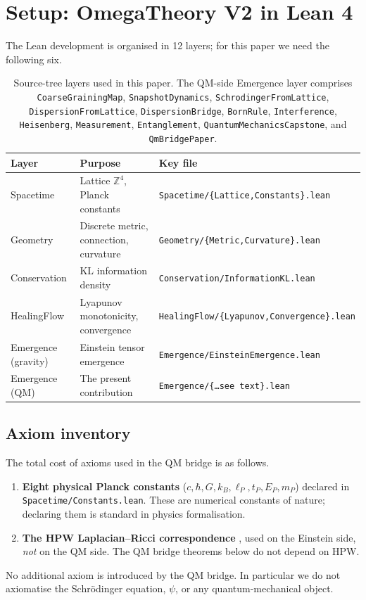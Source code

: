\documentclass[11pt,a4paper,twoside]{article}
\theoremstyle{definition}
\newcommand{\Zbb}{\mathbb{Z}}
\newcommand{\lP}{\ell_P}
\newcommand{\tP}{t_P}
\newcommand{\EP}{E_P}
\newcommand{\mP}{m_P}
\newcommand{\kB}{k_B}
\newcommand{\code}[1]{\texttt{#1}}
\begin{document}
\section{Setup: OmegaTheory V2 in Lean 4}\label{sec:setup}

The Lean development is organised in 12 layers; for this paper we
need the following six.

\begin{table}[h!]
\centering\small
\begin{tabular}{@{}lll@{}}
\toprule
Layer & Purpose & Key file \\
\midrule
Spacetime & Lattice $\Zbb^{4}$, Planck constants & \code{Spacetime/\{Lattice,Constants\}.lean} \\
Geometry & Discrete metric, connection, curvature & \code{Geometry/\{Metric,Curvature\}.lean} \\
Conservation & KL information density & \code{Conservation/InformationKL.lean} \\
HealingFlow & Lyapunov monotonicity, convergence & \code{HealingFlow/\{Lyapunov,Convergence\}.lean} \\
Emergence (gravity) & Einstein tensor emergence & \code{Emergence/EinsteinEmergence.lean} \\
Emergence (QM) & The present contribution & \code{Emergence/\{\ldots see text\}.lean} \\
\bottomrule
\end{tabular}
\caption{Source-tree layers used in this paper. The QM-side Emergence
layer comprises \code{CoarseGrainingMap},
\code{SnapshotDynamics}, \code{SchrodingerFromLattice},
\code{DispersionFromLattice}, \code{DispersionBridge}, \code{BornRule},
\code{Interference}, \code{Heisenberg}, \code{Measurement},
\code{Entanglement}, \code{QuantumMechanicsCapstone}, and
\code{QmBridgePaper}.}
\label{tab:layers}
\end{table}

\subsection{Axiom inventory}\label{sec:axioms}

The total cost of axioms used in the QM bridge is as follows.
\begin{enumerate}
\item \textbf{Eight physical Planck constants}
  ($c,\hbar,G,\kB,\lP,\tP,\EP,\mP$) declared in
  \code{Spacetime/Constants.lean}. These are numerical constants of
  nature; declaring them is standard in physics formalisation.
\item \textbf{The HPW Laplacian--Ricci correspondence}
  \cite{HildebrandtPolthierWardetzky2006}, used on the Einstein side,
  \emph{not} on the QM side. The QM bridge theorems below do not
  depend on HPW.
\end{enumerate}
No additional axiom is introduced by the QM bridge. In particular we
do not axiomatise the Schr\"odinger equation, $\psi$, or any
quantum-mechanical object.
\end{document}
